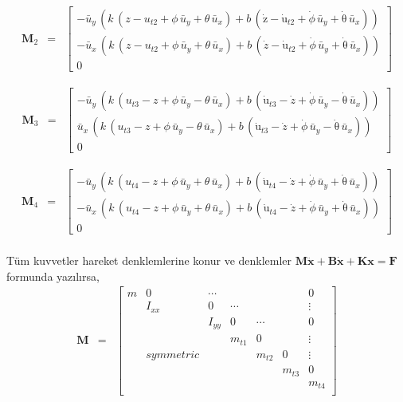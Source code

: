 \documentclass[a4paper]{report}
\begin{document}
\begin{eqnarray*}
\mathbf{M}_2&=&\left[\begin{array}{c}
 -\bar{u}_{y}\, \left(k\, \left(z - u_{t2} + \phi\, \bar{u}_{y} + \theta\, \bar{u}_{x}\right) + b \, \left(\mathrm{\dot{z}-\dot{u}}_{t2} + \dot{\phi}\, \bar{u}_{y} + \mathrm{\dot{\theta}}\, \bar{u}_{x}\right)\right)
\\ 
-\bar{u}_{x}\, \left(k\, \left( z-u_{t2} + \phi\, \bar{u}_{y} + \theta\, \bar{u}_{x}\right) + b\, \left( \dot{z}-\mathrm{\dot{u}}_{t2} + \dot{\phi}\, \bar{u}_{y} + \mathrm{\dot{\theta}}\, \bar{u}_{x}\right)\right)
\\
 0 \end{array} \right]
\end{eqnarray*}

\begin{eqnarray*}
\mathbf{M}_3&=&\left[\begin{array}{c}
 -\bar{u}_{y}\, \left(k\, \left(u_{t3} - z + \phi\, \bar{u}_{y} - \theta\, \bar{u}_{x}\right) + b \, \left(\mathrm{\dot{u}}_{t3} - \dot{z} + \dot{\phi}\, \bar{u}_{y} - \mathrm{\dot{\theta}}\, \bar{u}_{x}\right)\right)
\\ 
\bar{u}_{x}\, \left(k\, \left(u_{t3} - z + \phi\, \bar{u}_{y} - \theta\, \bar{u}_{x}\right) + b \, \left(\mathrm{\dot{u}}_{t3} - \dot{z} + \dot{\phi}\, \bar{u}_{y} - \mathrm{\dot{\theta}}\, \bar{u}_{x}\right)\right)
\\
 0 \end{array} \right]
\end{eqnarray*}

\begin{eqnarray*}
\mathbf{M}_4&=&\left[\begin{array}{c}
- \bar{u}_{y}\, \left(k\, \left(u_{t4} - z + \phi\, \bar{u}_{y} + \theta\, \bar{u}_{x}\right) + b\, \left(\mathrm{\dot{u}}_{t4} - \dot{z} + \dot{\phi}\, \bar{u}_{y}+ \mathrm{\dot{\theta}}\, \bar{u}_{x}\right)\right)
\\ 
-\bar{u}_{x}\, \left(k\, \left(u_{t4} - z + \phi\, \bar{u}_{y} + \theta\, \bar{u}_{x}\right) + b\, \left(\mathrm{\dot{u}}_{t4} - \dot{z} + \dot{\phi}\, \bar{u}_{y}+ \mathrm{\dot{\theta}}\, \bar{u}_{x}\right)\right)
\\
 0 \end{array} \right]
\end{eqnarray*}\\
Tüm kuvvetler hareket denklemlerine konur ve denklemler $\mathbf{M}\ddot{\mathbf{x}} + \mathbf{B} \dot{\mathbf{x}}+\mathbf{K}\mathbf{x}=\mathbf{F}$ formunda yazılırsa,
\begin{eqnarray*}
\mathbf{M}&=&\left[ 
\begin{array}{ccccccc}
m&0&\cdots&&&&0\\
&I_{xx}&0&\cdots&&&\vdots\\
&&I_{yy}&0&\cdots&&0\\
&&&m_{t1}&0&&\vdots\\
&symmetric&&&m_{t2}&0&\vdots\\
&&&&&m_{t3}&0\\
&&&&&&m_{t4}\\
\end{array} \right]
\end{eqnarray*}
\end{document}
